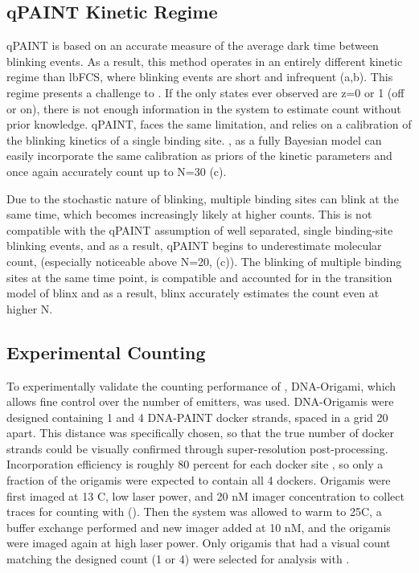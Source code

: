 \subsection{qPAINT Kinetic Regime}
qPAINT is based on an accurate measure of the average dark time between blinking events. 
	As a result, this method operates in an entirely different kinetic regime than lbFCS, where blinking 
	events are short and infrequent (a,b).
	This regime presents a challenge to \ours. 
	If the only states ever observed are z=0 or 1 (off or on), there is not enough information in the system to estimate count without prior knowledge.
	qPAINT, faces the same limitation, and relies on a calibration of the blinking kinetics of a single binding site.
	\ours, as a fully Bayesian model can easily incorporate the same calibration as priors of the kinetic parameters
	and once again accurately count up to N=30 (c).

Due to the stochastic nature of blinking, multiple binding sites can blink at the same time, which becomes increasingly likely at higher counts.
	This is not compatible with the qPAINT assumption of well separated, single binding-site blinking events, 
	and as a result, qPAINT begins to underestimate molecular count, (especially noticeable above N=20, (c)). 
	The blinking of multiple binding sites at the same time point, 
	is compatible and accounted for in the transition model of blinx 
	and as a result, blinx accurately estimates the count even at higher N.
	

\subsection{Experimental Counting}
To experimentally validate the counting performance of \ours, DNA-Origami, which allows fine control over the number of emitters, was used.
	DNA-Origamis were designed containing 1 and 4 DNA-PAINT docker strands, spaced in a grid 20 \nanometer apart. 
	This distance was specifically chosen, so that the true number of docker strands could be visually confirmed through super-resolution post-processing.
	Incorporation efficiency is roughly 80 percent for each docker site \cite{strauss_2018}, so only a fraction of the origamis were expected to contain all 4 dockers. 
	Origamis were first imaged at 13 C, low laser power, and 20 nM imager concentration to collect traces for counting with \ours ().
	Then the system was allowed to warm to 25C, a buffer exchange performed and new imager added at 10 nM, and the origamis were imaged again at high laser power.
	Only origamis that had a visual count matching the designed count (1 or 4) were selected for analysis with \ours.

